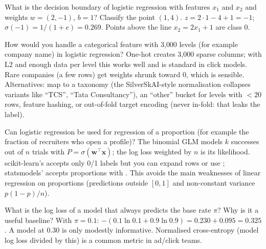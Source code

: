 \begin{qa}{What is the decision boundary of logistic regression with features $x_1$ and $x_2$ and weights $w = (2,
-1)$, $b = 1$? Classify the point $(1, 4)$.}
\why $z = 2\cdot1 - 4 + 1 = -1$; $\sigma(-1) = 1/(1 + e) = 0.269$. Points above the line $x_2 = 2x_1 + 1$ are class 0.
\end{qa}

\begin{qa}{How would you handle a categorical feature with 3{,}000 levels (for example company name) in logistic
regression?}
\why One-hot creates 3{,}000 sparse columns; with L2 and enough data per level this works well and is standard in click
models. Rare companies (a few rows) get weights shrunk toward 0, which is sensible. Alternatives: map to a taxonomy
(the SilverSkAI-style normalisation collapses variants like ``TCS'', ``Tata Consultancy''), an ``other'' bucket for
levels with $<20$ rows, feature hashing, or out-of-fold target encoding (never in-fold: that leaks the label).
\end{qa}

\begin{qa}{\deep Can logistic regression be used for regression of a proportion (for example the fraction of
recruiters who open a profile)?}
\why The binomial GLM models $k$ successes out of $n$ trials with $P = \sigma(\mathbf w^\top\mathbf x)$; the log loss
weighted by $n$ is its likelihood. scikit-learn's  accepts only 0/1 labels but you can expand
rows or use ; statsmodels'  accepts proportions with
. This avoids the main weaknesses of linear regression on proportions (predictions outside $[0,1]$
and non-constant variance $p(1-p)/n$).
\end{qa}

\begin{qa}{What is the log loss of a model that always predicts the base rate $\pi$? Why is it a useful baseline?}
\why With $\pi = 0.1$: $-(0.1\ln0.1 + 0.9\ln0.9) = 0.230 + 0.095 = 0.325$. A model at 0.30 is only modestly
informative. Normalised cross-entropy (model log loss divided by this) is a common metric in ad/click teams.
\end{qa}

